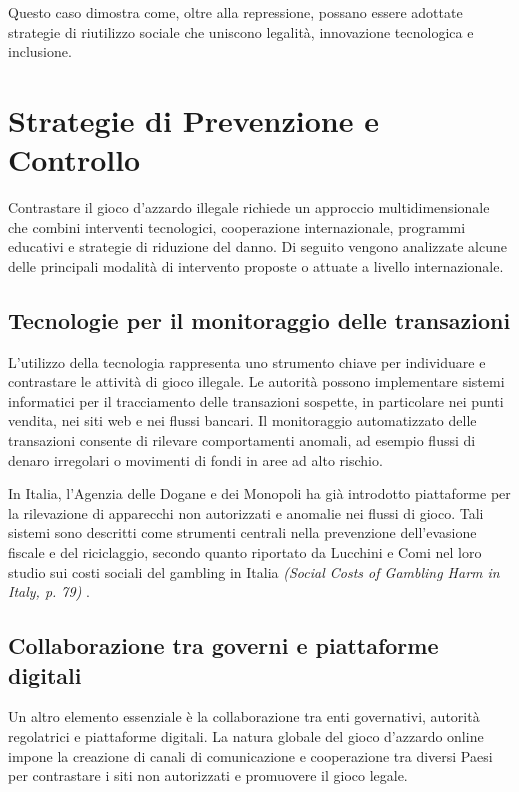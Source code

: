 \documentclass[a4paper,12pt]{article}
\begin{document}
Questo caso dimostra come, oltre alla repressione, possano essere adottate strategie di riutilizzo sociale che uniscono legalità, innovazione tecnologica e inclusione.


\section{Strategie di Prevenzione e Controllo}

Contrastare il gioco d’azzardo illegale richiede un approccio multidimensionale che combini interventi tecnologici, cooperazione internazionale, programmi educativi e strategie di riduzione del danno. Di seguito vengono analizzate alcune delle principali modalità di intervento proposte o attuate a livello internazionale.

\subsection{Tecnologie per il monitoraggio delle transazioni}

L’utilizzo della tecnologia rappresenta uno strumento chiave per individuare e contrastare le attività di gioco illegale. Le autorità possono implementare sistemi informatici per il tracciamento delle transazioni sospette, in particolare nei punti vendita, nei siti web e nei flussi bancari. Il monitoraggio automatizzato delle transazioni consente di rilevare comportamenti anomali, ad esempio flussi di denaro irregolari o movimenti di fondi in aree ad alto rischio.

In Italia, l’Agenzia delle Dogane e dei Monopoli ha già introdotto piattaforme per la rilevazione di apparecchi non autorizzati e anomalie nei flussi di gioco. Tali sistemi sono descritti come strumenti centrali nella prevenzione dell’evasione fiscale e del riciclaggio, secondo quanto riportato da Lucchini e Comi nel loro studio sui costi sociali del gambling in Italia \textit{(Social Costs of Gambling Harm in Italy, p. 79)} \cite{lucchini2022socialcosts}.

\subsection{Collaborazione tra governi e piattaforme digitali}

Un altro elemento essenziale è la collaborazione tra enti governativi, autorità regolatrici e piattaforme digitali. La natura globale del gioco d’azzardo online impone la creazione di canali di comunicazione e cooperazione tra diversi Paesi per contrastare i siti non autorizzati e promuovere il gioco legale.
\end{document}
